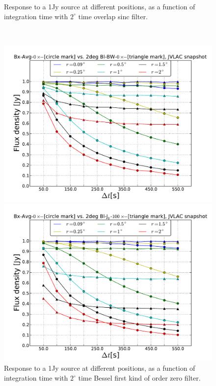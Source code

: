 \documentclass[useAMS,usenatbib]{mn2e}
\begin{document}
\begin{figure}
\begin{minipage}{0.38\linewidth}
        \caption{Response to a 1Jy source at different positions, as a function of integration time with $2^{\circ}$ time overlap sinc 
filter.}
      \label{fig:max-integ-time-sinc-w100x1-fov2}
      \end{minipage}\\
\begin{minipage}{0.38\linewidth}\includegraphics[width=1\textwidth]{./Figures/max-integ-time-bessel-w1x1-fov2.pdf}
    \caption{Response to a 1Jy source at different positions, as a function of integration time with $2^{\circ}$ time Bessel first kind of 
order zero
filter.}
    \label{fig:max-integ-time-bessel-w1x1-fov2}
    \end{minipage} 
 \hspace{1cm}
\begin{minipage}{0.38\linewidth}\includegraphics[width=1\textwidth]{./Figures/max-integ-time-bessel-w100x1-fov2.pdf}

\end{minipage}
\end{figure}
\end{document}
